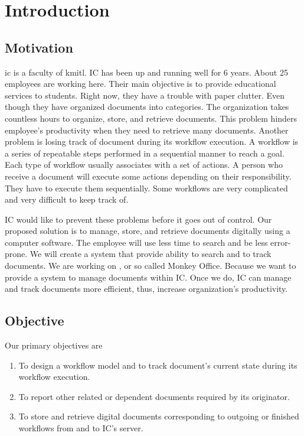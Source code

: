 \chapter{Introduction}

\section{Motivation}
\gls{ic} is a faculty of \gls{kmitl}. 
IC has been up and running well for 6 years.
About 25 employees are working here. %
Their main objective is to provide educational services to students. 
Right now, they have a trouble with paper clutter. 
Even though they have organized documents into categories. 
The organization takes countless hours to organize, store, and retrieve documents.
This problem hinders employee's productivity when they need to retrieve many documents. 
Another problem is losing track of document during its workflow execution. 
A workflow is a series of repeatable steps performed in a sequential manner to reach a goal.
Each type of workflow usually associates with a set of actions. 
A person who receive a document will execute some actions depending on their responsibility.
They have to execute them sequentially. 
Some workflows are very complicated and very difficult to keep track of.

IC would like to prevent these problems before it goes out of control. 
Our proposed solution is to manage, store, and retrieve documents digitally using a computer software.
The employee will use less time to search and be less error-prone.
We will create a system that provide ability to search and to track documents.
We are working on \MakeLowercase{\dms}, or so called Monkey Office.
Because we want to provide a system to manage documents within IC.
Once we do, IC can manage and track documents more efficient, thus, increase organization's productivity.

\section{Objective}
Our primary objectives are
\begin{enumerate}
\item To design a workflow model and to track document's current state during its workflow execution. 
\item To report other related or dependent documents required by its originator.
\item To store and retrieve digital documents corresponding to outgoing or finished workflows from and to IC's server.
\end{enumerate}

